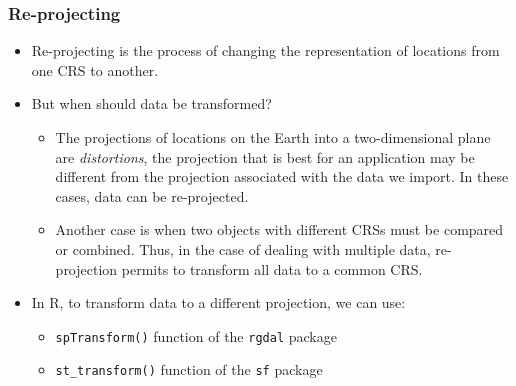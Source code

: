 \documentclass[11pt]{beamer}
\begin{document}
\begin{frame}
\frametitle{Re-projecting}
\begin{itemize} \setlength\itemsep{\fill}
\item Re-projecting is the process of changing the representation of locations from one CRS to another.
\item But when should data be transformed?
\begin{itemize} \setlength\itemsep{\fill}
\item The projections of locations on the Earth into a two-dimensional plane are \emph{distortions}, the projection that is best for an application may be different from the projection associated with the data we import. In these cases, data can be re-projected.
\item Another case is when two objects with different CRSs must be compared or combined. Thus, in the case of dealing with multiple data, re-projection permits to transform all data to a common CRS.
\end{itemize}
\item In R, to transform data to a different projection, we can use:
\begin{itemize}\setlength\itemsep{\fill}
  \item \texttt{spTransform()} function of the \texttt{rgdal} package
  \item \texttt{st\_transform()} function of the \texttt{sf} package
\end{itemize}
\end{itemize}
\end{frame}
\end{document}
